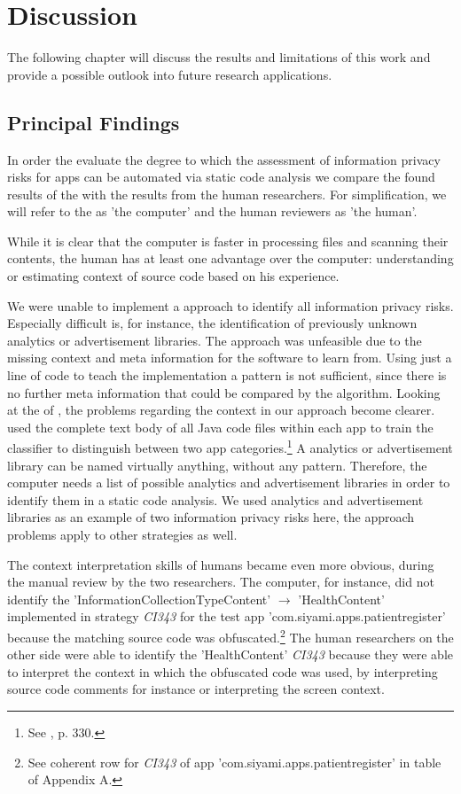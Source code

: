 \section{Discussion}

The following chapter will discuss the results and limitations of this work and provide a possible outlook into future research applications.

\subsection{Principal Findings}

In order the evaluate the degree to which the assessment of information privacy risks for \mH apps can be automated via static code analysis we compare the \ipr found results of the \aiprat with the results from the human researchers.
For simplification, we will refer to the \aiprat as 'the computer' and the human reviewers as 'the human'.

While it is clear that the computer is faster in processing files and scanning their contents, the human has at least one advantage over the computer: understanding or estimating context of source code based on his experience.

We were unable to implement a \ml approach to identify all information privacy risks.
Especially difficult is, for instance, the identification of previously unknown analytics or advertisement libraries.
The \ml approach was unfeasible due to the missing context and meta information for the software to learn from.
Using just a line of code to teach the \ml implementation a pattern is not sufficient, since there is no further meta information that could be compared by the algorithm.
Looking at the \ml of \textcite{Shabtai2010}, the problems regarding the context in our approach become clearer.
\textcite{Shabtai2010} used the complete text body of all Java code files within each app to train the \ml classifier to distinguish between two app categories.\footnote{See \cite{Shabtai2010}, p. 330.}
A analytics or advertisement library can be named virtually anything, without any pattern.
Therefore, the computer needs a list of possible analytics and advertisement libraries in order to identify them in a static code analysis.
We used analytics and advertisement libraries as an example of two information privacy risks here, the \ml approach problems apply to other \ipr strategies as well.

The context interpretation skills of humans became even more obvious, during the manual review by the two researchers.
The computer, for instance, did not identify the \ipr 'InformationCollectionTypeContent' $\rightarrow$ 'HealthContent' implemented in strategy \textit{CI343} for the test app 'com.siyami.apps.patientregister' because the matching source code was obfuscated.\footnote{See coherent row for \textit{CI343} of app 'com.siyami.apps.patientregister'  in table of Appendix A.}
The human researchers on the other side were able to identify the 'HealthContent' \textit{CI343} \ipr because they were able to interpret the context in which the obfuscated code was used, by interpreting source code comments for instance or interpreting the screen context.


